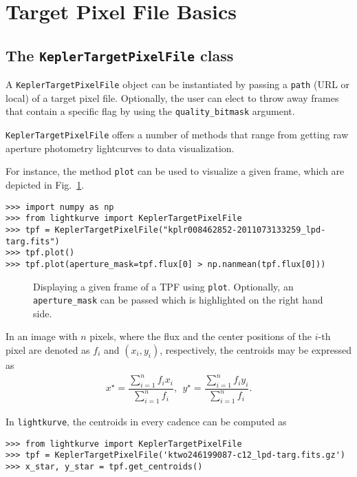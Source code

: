 \documentclass[twocolumn]{aastex62}
\begin{document}
\section{Target Pixel File Basics}
    \subsection{The \texttt{KeplerTargetPixelFile} class}
        A \texttt{KeplerTargetPixelFile} object can be instantiated
        by passing a \texttt{path} (URL or local) of a target pixel file.
        Optionally, the user can elect to throw away frames that contain
        a specific flag by using the \texttt{quality\_bitmask} argument.

        \texttt{KeplerTargetPixelFile} offers a number of methods
        that range from getting raw aperture photometry lightcurves to
        data visualization.

        For instance, the method \texttt{plot} can be used to visualize a
        given frame, which are depicted in Fig.~\ref{fig:plot-method}.
\begin{verbatim}
>>> import numpy as np
>>> from lightkurve import KeplerTargetPixelFile
>>> tpf = KeplerTargetPixelFile("kplr008462852-2011073133259_lpd-targ.fits")
>>> tpf.plot()
>>> tpf.plot(aperture_mask=tpf.flux[0] > np.nanmean(tpf.flux[0]))
\end{verbatim}

\begin{figure}[!htb]
    \centering
    \caption{Displaying a given frame of a TPF using \texttt{plot}.
    Optionally, an \texttt{aperture\_mask} can be passed which is
    highlighted on the right hand side.}
    \label{fig:plot-method}
\end{figure}

In an image with $n$ pixels, where the flux and the center positions of the
$i$-th pixel are denoted as $f_i$ and $(x_i, y_i)$, respectively, the centroids
may be expressed as
\begin{align}
    x^{\star} = \dfrac{\sum_{i=1}^{n} f_i x_i}{\sum_{i=1}^{n}f_i},
    ~~y^{\star} = \dfrac{\sum_{i=1}^{n} f_i y_i}{\sum_{i=1}^{n}f_i}.
\end{align}

In \texttt{lightkurve}, the centroids in every cadence can be computed as
\begin{verbatim}
>>> from lightkurve import KeplerTargetPixelFile
>>> tpf = KeplerTargetPixelFile('ktwo246199087-c12_lpd-targ.fits.gz')
>>> x_star, y_star = tpf.get_centroids()
\end{verbatim}
\end{document}
